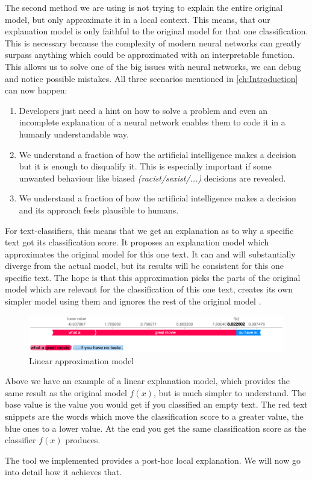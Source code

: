 The second method we are using is not trying to explain the entire original model, but only approximate it in a local context. This means, that our explanation model is only faithful to the original model for that one classification. This is necessary because the complexity of modern neural networks can greatly surpass anything which could be approximated with an interpretable function. This allows us to solve one of the big issues with neural networks, we can debug and notice possible mistakes. All three scenarios mentioned in \autoref{ch:Introduction} can now happen:

\begin{enumerate}
    \item Developers just need a hint on how to solve a problem and even an incomplete explanation of a neural network enables them to code it in a humanly understandable way.
    \item We understand a fraction of how the artificial intelligence makes a decision but it is enough to disqualify it. This is especially important if some unwanted behaviour like biased \textit{(racist/sexist/...)} decisions are revealed.
    \item We understand a fraction of how the artificial intelligence makes a decision and its approach feels plausible to humans.
\end{enumerate}

For text-classifiers, this means that we get an explanation as to why a specific text got its classification score. It proposes an explanation model which approximates the original model for this one text. It can and will substantially diverge from the actual model, but its results will be consistent for this one specific text. The hope is that this approximation picks the parts of the original model which are relevant for the classification of this one text, creates its own simpler model using them and ignores the rest of the original model \cite{ExampleBasedExplanation}.

\begin{figure}[H]
    \centering
    \includegraphics[width=\linewidth]{images/03_basics/sentiment_analysis_plot_movie.png}
    \caption{Linear approximation model \cite{shapDocs}}
    \label{fig:shapMovieExplained}
\end{figure}

Above we have an example of a linear explanation model, which provides the same result as the original model $f(x)$, but is much simpler to understand. The base value is the value you would get if you classified an empty text. The red text snippets are the words which move the classification score to a greater value, the blue ones to a lower value. At the end you get the same classification score as the classifier $f(x)$ produces.

\vspace{2cm}

The tool we implemented provides a post-hoc local explanation. We will now go into detail how it achieves that.